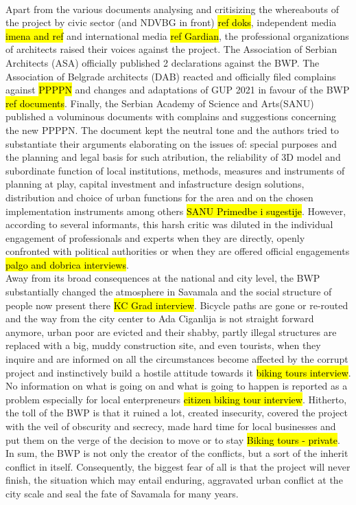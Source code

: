 \documentclass[11pt]{report}
\begin{document}
\\
Apart from the various documents analysing and critisizing the whereabouts of the project by civic sector (and NDVBG in front) \hl{ref doks}, independent media \hl{imena and ref} and international media \hl{ref Gardian}, the professional organizations of architects raised their voices against the project.
The Association of Serbian Architects (ASA) officially published 2 declarations against the BWP. 
The Association of Belgrade architects (DAB) reacted and officially filed complains against \hl{PPPPN} and changes and adaptations of GUP 2021 in favour of the BWP \hl{ref documents}.
Finally, the Serbian Academy of Science and Arts(SANU) published a voluminous documents with complains and suggestions concerning the new PPPPN. The document kept the neutral tone and the authors tried to substantiate their arguments elaborating on the issues of: special purposes and the planning and legal basis for such atribution, the reliability of 3D model and subordinate function of local institutions, methods, measures and instruments of planning at play, capital investment and infastructure design solutions, distribution and choice of urban functions for the area and on the chosen implementation instruments among others \hl{SANU Primedbe i sugestije}. 
However, according to several informants, this harsh critic was diluted in the individual engagement of professionals and experts when they are directly, openly confronted with political authorities or when they are offered official engagements \hl{palgo and dobrica interviews}.
\\
Away from its broad consequences at the national and city level, the BWP substantially changed the atmosphere in Savamala and the social structure of people now present there
\hl{KC Grad interview}. Bicycle paths are gone or re-routed and the way from the city center to Ada Ciganlija is not straight forward anymore, urban poor are evicted and their shabby, partly illegal structures are replaced with a big, muddy construction site, and even tourists, when they inquire and are informed on all the circumstances become affected by the corrupt project and instinctively build a hostile attitude towards it \hl{biking tours interview}.
No information on what is going on and what is going to happen is reported as a problem especially for local enterpreneurs \hl{citizen biking tour interview}.
Hitherto, the toll of the BWP is that it ruined a lot, created insecurity, covered the project with the veil of obscurity and secrecy, made hard time for local businesses and put them on the verge of the decision to move or to stay
\hl{Biking tours - private}.
In sum, the BWP is not only the creator of the conflicts, but a sort of the inherit conflict in itself.
Consequently, the biggest fear of all is that the project will never finish, the situation which may entail enduring, aggravated urban conflict at the city scale and seal the fate of Savamala for many years.
\end{document}
